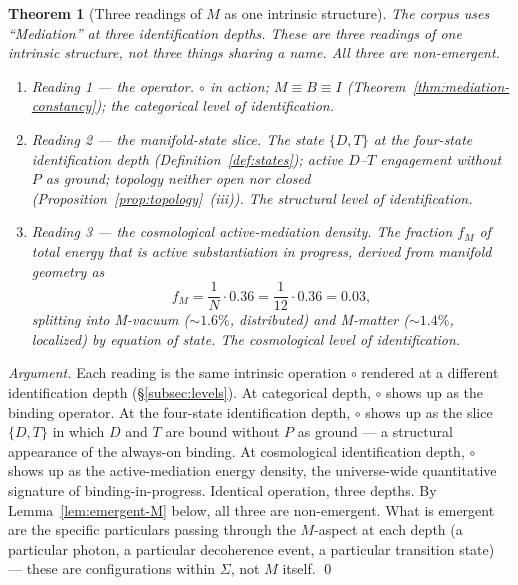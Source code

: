 \documentclass[11pt,a4paper]{article}
\newtheorem{theorem}{Theorem}[section]
\theoremstyle{definition}
\theoremstyle{remark}
\begin{document}
\begin{theorem}[Three readings of $M$ as one intrinsic structure]\label{thm:M-three-readings}
The corpus uses ``Mediation'' at three identification depths. These are three readings of one intrinsic structure, not three things sharing a name. All three are non-emergent.
\begin{enumerate}[label=\textnormal{(\roman*)},leftmargin=*]
\item \emph{Reading 1 --- the operator.} $\circ$ in action; $M \equiv B \equiv I$ (Theorem~\ref{thm:mediation-constancy}); the categorical level of identification.
\item \emph{Reading 2 --- the manifold-state slice.} The state $\{D, T\}$ at the four-state identification depth (Definition~\ref{def:states}); active $D$--$T$ engagement without $P$ as ground; topology neither open nor closed (Proposition~\ref{prop:topology}~(iii)). The structural level of identification.
\item \emph{Reading 3 --- the cosmological active-mediation density.} The fraction $f_{M}$ of total energy that is active substantiation in progress, derived from manifold geometry as
\[
f_{M} = \frac{1}{N}\cdot 0.36 = \frac{1}{12}\cdot 0.36 = 0.03,
\]
splitting into M-vacuum ($\sim 1.6\%$, distributed) and M-matter ($\sim 1.4\%$, localized) by equation of state. The cosmological level of identification.
\end{enumerate}
\end{theorem}

\begin{proof}[Argument]
Each reading is the same intrinsic operation $\circ$ rendered at a different identification depth (\S\ref{subsec:levels}). At categorical depth, $\circ$ shows up as the binding operator. At the four-state identification depth, $\circ$ shows up as the slice $\{D,T\}$ in which $D$ and $T$ are bound without $P$ as ground --- a structural appearance of the always-on binding. At cosmological identification depth, $\circ$ shows up as the active-mediation energy density, the universe-wide quantitative signature of binding-in-progress. Identical operation, three depths. By Lemma~\ref{lem:emergent-M} below, all three are non-emergent. What is emergent are the specific particulars passing through the $M$-aspect at each depth (a particular photon, a particular decoherence event, a particular transition state) --- these are configurations within $\Sigma$, not $M$ itself. \qed
\end{proof}
\end{document}
